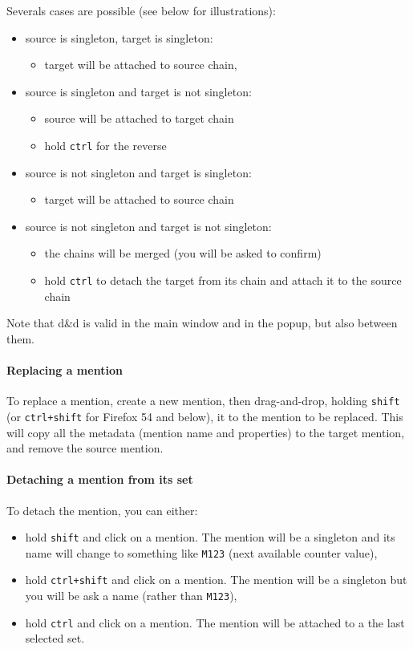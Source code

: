 \documentclass[12pt]{article}
\begin{document}
Severals cases are possible (see below for illustrations):
\begin{itemize}
   \item source is singleton, target is singleton:
      \begin{itemize}
      \item target will be attached to source chain,
      \end{itemize}
   \item source is singleton and target is not singleton:
      \begin{itemize}
      \item source will be attached to target chain
      \item hold \verb|ctrl| for the reverse
      \end{itemize}
   \item source is not singleton and target is singleton:
      \begin{itemize}
      \item target will be attached to source chain
      \end{itemize}
   \item source is not singleton and target is not singleton:
      \begin{itemize}
      \item the chains will be merged (you will be asked to confirm)
      \item hold \verb|ctrl| to detach the target from its chain and attach
      it to the source chain
      \end{itemize}
\end{itemize}

Note that d\&d is valid in the main window and in the popup, but also between
them.

\paragraph{Replacing a mention} To replace a mention, create a new mention,
then drag-and-drop, holding \verb|shift| (or \verb|ctrl+shift| for Firefox 54
and below), it to the mention to be replaced.  This will copy all the metadata
(mention name and properties) to the target mention, and remove the source
mention.

\paragraph{Detaching a mention from its set} To detach the mention, you
can either:
\begin{itemize}
   \item hold \verb|shift| and click on a mention.  The mention will be a
   singleton and its name will change to something like \verb|M123| (next
   available counter value),
   \item hold \verb|ctrl+shift| and click on a mention.  The mention will be
   a singleton but you will be ask a name (rather than \verb|M123|),
   \item hold \verb|ctrl| and click on a mention.  The mention will be
   attached to a the last selected set.
\end{itemize}
\end{document}
